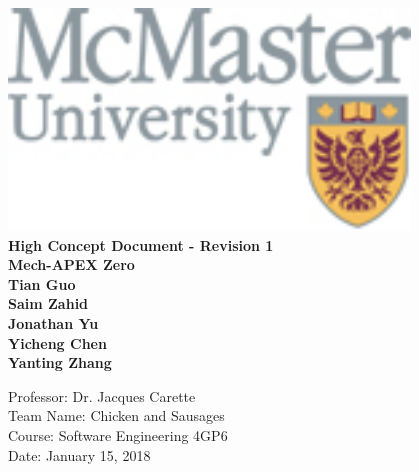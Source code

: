 \documentclass{article}
\begin{document}

\begin{titlepage}
    \begin{center}
        \vspace*{1cm}
        \includegraphics[width=0.8\textwidth]{logo.jpg}
        \\
        \textbf{\Large High Concept Document - Revision 1}
        \vspace{0.5cm}
        \textbf{\Large  \\Mech-APEX Zero}
        \vspace{1cm}
        \textbf{\\Tian Guo\\Saim Zahid\\Jonathan Yu\\ Yicheng Chen \\Yanting Zhang }
        \vfill
        \vspace{0.8cm}
        \begin{flushright}
        Professor: Dr. Jacques Carette\\
        Team Name: Chicken and Sausages\\
        Course: Software Engineering 4GP6\\
        Date: January 15, 2018
        \end{flushright}
    \end{center}
\end{titlepage}
\end{document}
